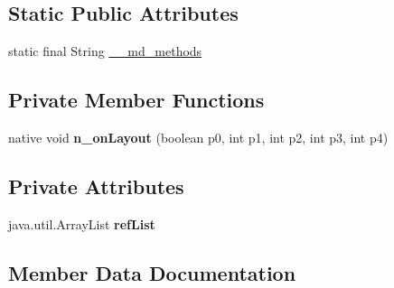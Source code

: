 \subsection*{Static Public Attributes}
\begin{DoxyCompactItemize}
\item 
static final String \hyperlink{classmd5270abb39e60627f0f200893b490a1ade_1_1Platform__ModalContainer_a43ca49e3a86d594a515e295f1356f624}{\+\_\+\+\_\+md\+\_\+methods}
\end{DoxyCompactItemize}
\subsection*{Private Member Functions}
\begin{DoxyCompactItemize}
\item 
\mbox{\label{classmd5270abb39e60627f0f200893b490a1ade_1_1Platform__ModalContainer_ab786bb28e11cf2bfaeaeaaa0f9eb34cf}} 
native void {\bfseries n\+\_\+on\+Layout} (boolean p0, int p1, int p2, int p3, int p4)
\end{DoxyCompactItemize}
\subsection*{Private Attributes}
\begin{DoxyCompactItemize}
\item 
\mbox{\label{classmd5270abb39e60627f0f200893b490a1ade_1_1Platform__ModalContainer_a34509ff100ef69e7caefbb3d40346429}} 
java.\+util.\+Array\+List {\bfseries ref\+List}
\end{DoxyCompactItemize}


\subsection{Member Data Documentation}
\mbox{\label{classmd5270abb39e60627f0f200893b490a1ade_1_1Platform__ModalContainer_a43ca49e3a86d594a515e295f1356f624}} 
